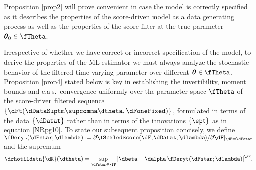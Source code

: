 


Proposition \ref{prop2} will prove convenient in case the model is correctly specified as it describes the properties of the score-driven model as a data generating process as well as the properties of the score filter at the true parameter $\boldsymbol{\theta}_{0} \in \fTheta$.


Irrespective of whether we have correct or incorrect specification of the model, to derive the properties of the ML estimator  we must always analyze the stochastic behavior of the filtered time-varying parameter over different $\boldsymbol{\theta} \in \fTheta$.
Proposition \ref{prop4} stated below is key in establishing the invertibility, moment bounds and e.a.s.\ convergence uniformly over the parameter space $\fTheta$ of the score-driven filtered sequence
$\{\dFt(\dDataSuptm\supcomma \dtheta,\dFoneFixed)\}$, formulated in terms of the data $\{\dDatat\}$ rather than in terms of the innovations $\{\ept\}$ as in equation \eqref{NRpg10}.
To state our subsequent proposition concisely, we define 
$\fDeryt(\dFstar;\dlambda) := \partial \fScaledScore  (\dF, \dDatat; \dlambda)/\partial \dF|_{\dF=\dFstar}$ 
and the supremum 
\begin{align} \label{DefRhoTilde}
    \drhotildetn{\dK}(\dtheta) = \sup_{\dFstar \in \fF}
    | \dbeta + \dalpha\, \fDeryt(\dFstar;\dlambda)|^{\dK}.%
\end{align}

